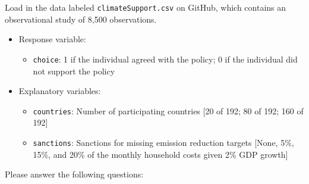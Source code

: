 \documentclass[12pt,letterpaper]{article}
\begin{document}
\noindent Load in the data labeled \texttt{climateSupport.csv} on GitHub, which contains an observational study of 8,500 observations.

\begin{itemize}
	\item
	Response variable: 
	\begin{itemize}
		\item \texttt{choice}: 1 if the individual agreed with the policy; 0 if the individual did not support the policy
	\end{itemize}
	\item
	Explanatory variables: 
	\begin{itemize}
		\item
		\texttt{countries}: Number of participating countries [20 of 192; 80 of 192; 160 of 192]
		\item
		\texttt{sanctions}: Sanctions for missing emission reduction targets [None, 5\%, 15\%, and 20\% of the monthly household costs given 2\% GDP growth]
		
	\end{itemize}
	
\end{itemize}

\newpage
\noindent Please answer the following questions:
\end{document}
